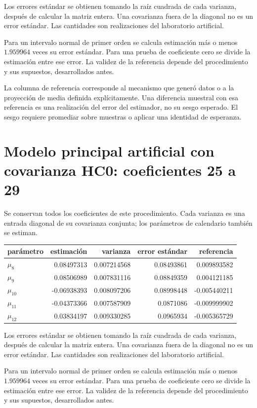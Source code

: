 \documentclass[11pt,a4paper]{article}
\begin{document}
Los errores estándar se obtienen tomando la raíz cuadrada de cada varianza, después de calcular la matriz entera. Una covarianza fuera de la diagonal no es un error estándar. Las cantidades son realizaciones del laboratorio artificial.

Para un intervalo normal de primer orden se calcula estimación más o menos $1.959964$ veces su error estándar. Para una prueba de coeficiente cero se divide la estimación entre ese error. La validez de la referencia depende del procedimiento y sus supuestos, desarrollados antes.

La columna de referencia corresponde al mecanismo que generó datos o a la proyección de media definida explícitamente. Una diferencia muestral con esa referencia es una realización del error del estimador, no su sesgo esperado. El sesgo requiere promediar sobre muestras o aplicar una identidad de esperanza.

\clearpage
\section{Modelo principal artificial con covarianza HC0: coeficientes 25 a 29}
Se conservan todos los coeficientes de este procedimiento. Cada varianza es una entrada diagonal de su covarianza conjunta; los parámetros de calendario también se estiman.
\begin{center}\small
\begin{tabular}{lrrrr}
\toprule
parámetro & estimación & varianza & error estándar & referencia\\\midrule
$\mu_8$ & 0.08497313 & 0.007214568 & 0.08493861 & 0.009893582\\
$\mu_9$ & 0.08506989 & 0.007831116 & 0.08849359 & 0.004121185\\
$\mu_10$ & -0.06938393 & 0.008097206 & 0.08998448 & -0.005440211\\
$\mu_11$ & -0.04373366 & 0.007587909 & 0.0871086 & -0.009999902\\
$\mu_12$ & 0.03834197 & 0.009330285 & 0.0965934 & -0.005365729\\
\bottomrule
\end{tabular}\end{center}

Los errores estándar se obtienen tomando la raíz cuadrada de cada varianza, después de calcular la matriz entera. Una covarianza fuera de la diagonal no es un error estándar. Las cantidades son realizaciones del laboratorio artificial.

Para un intervalo normal de primer orden se calcula estimación más o menos $1.959964$ veces su error estándar. Para una prueba de coeficiente cero se divide la estimación entre ese error. La validez de la referencia depende del procedimiento y sus supuestos, desarrollados antes.
\end{document}
